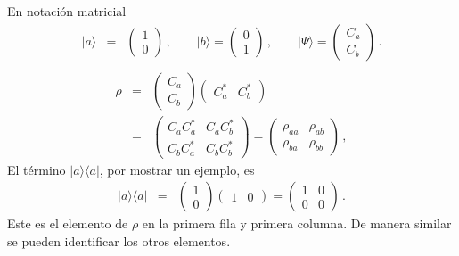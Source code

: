 \documentclass[12pt]{report}
\providecommand{\bra}[1]{\langle #1 \rvert}
\providecommand{\ket}[1]{\lvert #1 \rangle}
\begin{document}
En notaci\'on matricial 
%
\begin{eqnarray}
\ket{a} &=&  \left( \begin{array}{c} 1 \\ 0 \end{array} \right) \,, \qquad 
	\ket{b} = \left( \begin{array}{c} 0 \\ 1 \end{array} \right) \,, \qquad 
	\ket{\Psi} = \left( \begin{array}{c} C_a \\ C_b \end{array} \right) \,. 
	\nonumber \\
\end{eqnarray}
%
\begin{eqnarray}
\rho &=&  \left( \begin{array}{c} C_a \\ C_b \end{array} \right) 
	\left( \begin{array}{cc} C_a^{\ast} & C_b^{\ast} \end{array} \right) 	
	\nonumber \\ 
&=& \left( \begin{array}{cc}  C_a C_a^{\ast} & C_a C_b^{\ast}  \\ 
	C_b C_a^{\ast}  & C_b C_b^{\ast}   \end{array} \right) 	
	=  \left( \begin{array}{cc}  \rho_{aa} & \rho_{ab}  \\ 
	\rho_{ba}  & \rho_{bb}   \end{array} \right) 	\,,
\end{eqnarray}
El t\'ermino $\ket{a}\bra{a}$, por mostrar un ejemplo, es 
%
\begin{eqnarray}
\ket{a}\bra{a} &=&  \left( \begin{array}{c} 1 \\ 0 \end{array} \right) 
	\left( \begin{array}{cc} 1 & 0 \end{array} \right) 	
	= \left( \begin{array}{cc}  1 & 0  \\ 0  & 0   \end{array} \right) \,.
\end{eqnarray}
Este es el elemento de $\rho$ en la primera fila y primera columna. 
De manera similar se pueden identificar los otros elementos. 
\end{document}
